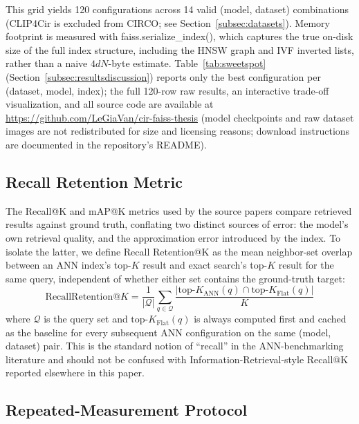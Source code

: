 \documentclass[conference]{IEEEtran}
\begin{document}
This grid yields 120 configurations across 14 valid (model, dataset) combinations (CLIP4Cir is excluded from CIRCO; see Section~\ref{subsec:datasets}). Memory footprint is measured with faiss.serialize\_index(), which captures the true on-disk size of the full index structure, including the HNSW graph and IVF inverted lists, rather than a naive $4dN$-byte estimate. Table~\ref{tab:sweetspot} (Section~\ref{subsec:resultsdiscussion}) reports only the best configuration per (dataset, model, index); the full 120-row raw results, an interactive trade-off visualization, and all source code are available at \url{https://github.com/LeGiaVan/cir-faiss-thesis} (model checkpoints and raw dataset images are not redistributed for size and licensing reasons; download instructions are documented in the repository's README).

\subsection{Recall Retention Metric}
\label{subsec:retention}

The Recall@K and mAP@K metrics used by the source papers compare retrieved results against ground truth, conflating two distinct sources of error: the model's own retrieval quality, and the approximation error introduced by the index. To isolate the latter, we define Recall Retention@K as the mean neighbor-set overlap between an ANN index's top-$K$ result and exact search's top-$K$ result for the same query, independent of whether either set contains the ground-truth target:
\begin{equation}
\text{RecallRetention@}K = \frac{1}{|\mathcal{Q}|}\sum_{q \in \mathcal{Q}} \frac{\left| \text{top-}K_{\text{ANN}}(q) \cap \text{top-}K_{\text{Flat}}(q) \right|}{K}
\label{eq:retention}
\end{equation}
where $\mathcal{Q}$ is the query set and $\text{top-}K_{\text{Flat}}(q)$ is always computed first and cached as the baseline for every subsequent ANN configuration on the same (model, dataset) pair. This is the standard notion of ``recall'' in the ANN-benchmarking literature and should not be confused with Information-Retrieval-style Recall@K reported elsewhere in this paper.

\subsection{Repeated-Measurement Protocol}
\label{subsec:repeated}
\end{document}
